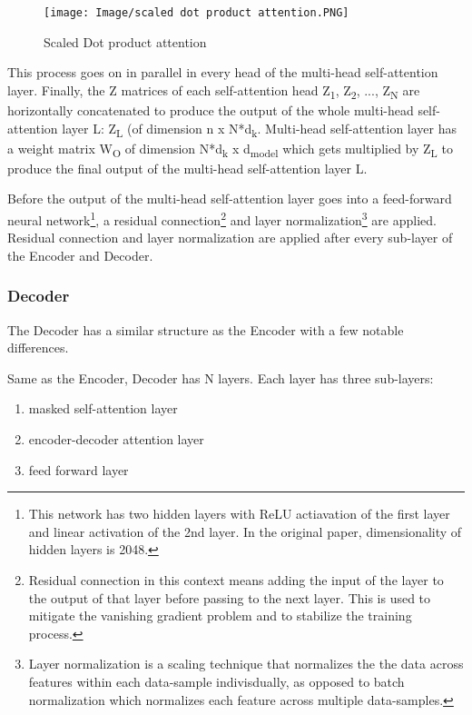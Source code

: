 \begin{figure}[h]
\centering
\texttt{[image: Image/scaled dot product attention.PNG]}
\caption{Scaled Dot product attention \cite{vaswani2017attention}}
\label{fig:scaleddotproductattention}
\end{figure}


This process goes on in parallel in every head of the multi-head self-attention layer. Finally, the Z matrices of each self-attention head Z\textsubscript{1}, Z\textsubscript{2}, ..., Z\textsubscript{N} are horizontally concatenated to produce the output of the whole multi-head self-attention layer L: Z\textsubscript{L} (of dimension n x N*d\textsubscript{k}. Multi-head self-attention layer has a weight matrix W\textsubscript{O} of dimension N*d\textsubscript{k} x d\textsubscript{model} which gets multiplied by Z\textsubscript{L} to produce the final output of the multi-head self-attention layer L.

Before the output of the multi-head self-attention layer goes into a feed-forward neural network\footnote{This network has two hidden layers with ReLU actiavation of the first layer and linear activation of the 2nd layer. In the original paper, dimensionality of hidden layers is 2048.}, a residual connection\footnote{Residual connection in this context means adding the input of the layer to the output of that layer before passing to the next layer. This is used to mitigate the vanishing gradient problem and to stabilize the training process.} \cite{he2016deep} and layer normalization\footnote{Layer normalization is a scaling technique that normalizes the the data across features within each data-sample indivisdually, as opposed to batch normalization which normalizes each feature across multiple data-samples.} \cite{ba2016layer} are applied. Residual connection and layer normalization are applied after every sub-layer of the Encoder and Decoder.  

\subsubsection{Decoder}

The Decoder has a similar structure as the Encoder with a few notable differences.

Same as the Encoder, Decoder has N layers. Each layer has three sub-layers: 

\begin{enumerate}
    \item masked self-attention layer
    \item encoder-decoder attention layer
    \item feed forward layer
\end{enumerate}
 

